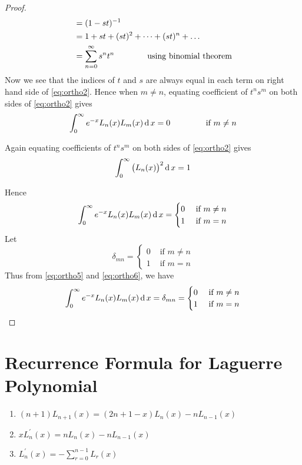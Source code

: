 \documentclass[../main-sheet.tex]{subfiles}
\begin{document}
\begin{proof}
\begin{align}
        &=(1-st)^{-1}\notag\\
        &=1+st+(st)^2+\dots+(st)^n+\dots\notag\\
        &=\sum_{n=0}^\infty s^nt^n\qquad\qquad\text{using binomial theorem}\label{eq:ortho2}
    \end{align}
    Now we see that the indices of \( t \) and \( s \) are always equal in each term on right hand side of \eqref{eq:ortho2}. Hence when \( m\neq n \), equating coefficient of \( t^ns^m \) on both sides of \eqref{eq:ortho2} gives
    \begin{equation}
        \int_0^\infty  e^{-x}L_n(x)L_m(x)\,\mathrm{d}\, x=0\qquad\qquad \text{ if } m\neq n \label{eq:ortho3}
    \end{equation}

    Again equating coefficients of \( t^ns^m \) on both sides of \eqref{eq:ortho2} gives
    \begin{equation}
        \int_0^\infty \big(L_n(x)\big)^2\,\mathrm{d}\, x=1\label{eq:ortho4}
    \end{equation}
    
    Hence
    \begin{equation}
        \int_0^\infty e^{-x}L_n(x)L_m(x)\,\mathrm{d}\, x=
        \begin{cases}
            0&\text{ if }m\neq n\\
            1&\text{ if }m= n
        \end{cases} \label{eq:ortho5}
    \end{equation}
    Let
    \begin{equation}
        \delta_{mn}=
        \begin{cases}
            0&\text{ if }m\neq n\\
            1&\text{ if }m= n
        \end{cases} \label{eq:ortho6}
    \end{equation}
    Thus from \eqref{eq:ortho5} and \eqref{eq:ortho6}, we have
    \[
        \int_0^\infty e^{-x}L_n(x)L_m(x)\,\mathrm{d}\, x=\delta_{mn}=\begin{cases}
            0&\text{ if }m\neq n\\
            1&\text{ if }m= n
        \end{cases}
    \]
\end{proof}
\section{Recurrence Formula for Laguerre Polynomial}
\begin{enumerate}[label={(\roman*)}]
    \item \((n+1)L_{n+1}(x)=(2n+1-x)L_n(x)-nL_{n-1}(x)\)
    \item \(xL_{n}^{'}(x)=nL_n(x)-nL_{n-1}(x)\)
    \item \(L_{n}^{'}(x)=-\sum_{r=0}^{n-1}L_r(x)\)
\end{enumerate}
\newpage
\end{document}
